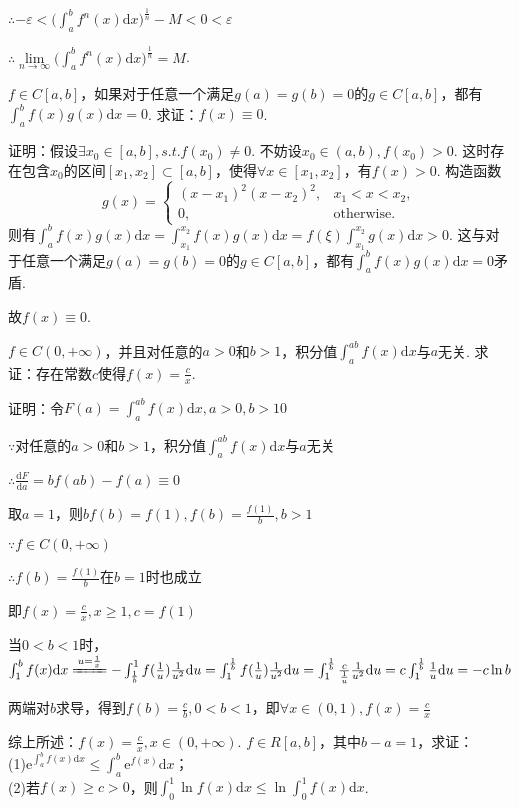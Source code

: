 \documentclass[12pt,UTF8]{ctexart}
\begin{document}
\begin{enumerate}
$\therefore-\varepsilon<\Big(\int_a^bf^n(x)\mathrm dx\Big)^{\frac1n}-M<0<\varepsilon$

$\therefore\lim\limits_{n\rightarrow\infty}\Big(\int_a^bf^n(x)\mathrm dx\Big)^{\frac1n}=M$.

$f\in C[a,b]$，如果对于任意一个满足$g(a)=g(b)=0$的$g\in C[a,b]$，都有$\int_a^bf(x)g(x)\mathrm dx=0$. 求证：$f(x)\equiv0$.

证明：假设$\exists x_0\in[a,b],s.t.f(x_0)\neq0$. 不妨设$x_0\in(a,b),f(x_0)>0$. 这时存在包含$x_0$的区间$[x_1,x_2]\subset[a,b]$，使得$\forall x\in[x_1,x_2]$，有$f(x)>0$. 构造函数
\[
g(x)=\begin{cases}
(x-x_1)^2(x-x_2)^2,&x_1<x<x_2,\\
0,&\text{otherwise}.
\end{cases}
\]
则有$\int_a^bf(x)g(x)\mathrm dx=\int_{x_1}^{x_2}f(x)g(x)\mathrm dx=f(\xi)\int_{x_1}^{x_2}g(x)\mathrm dx>0$. 这与对于任意一个满足$g(a)=g(b)=0$的$g\in C[a,b]$，都有$\int_a^bf(x)g(x)\mathrm dx=0$矛盾.

故$f(x)\equiv0$.

$f\in C(0,+\infty)$，并且对任意的$a>0$和$b>1$，积分值$\int_a^{ab}f(x)\mathrm dx$与$a$无关. 求证：存在常数$c$使得$f(x)=\frac cx$.

证明：令$F(a)=\int_a^{ab}f(x)\mathrm dx,a>0,b>10$

$\because$对任意的$a>0$和$b>1$，积分值$\int_a^{ab}f(x)\mathrm dx$与$a$无关

$\therefore\frac{\mathrm dF}{\mathrm da}=bf(ab)-f(a)\equiv0$

取$a=1$，则$bf(b)=f(1),f(b)=\frac{f(1)}b,b>1$

$\because f\in C(0,+\infty)$

$\therefore f(b)=\frac{f(1)}b$在$b=1$时也成立

即$f(x)=\frac cx,x\geq1,c=f(1)$

当$0<b<1$时，$\int_1^bf(x)\mathrm dx\xlongequal{u=\frac1x}-\int_{\frac1b}^1f(\frac1u)\frac1{u^2}\mathrm du=\int_1^{\frac1b}f(\frac1u)\frac1{u^2}\mathrm du=\int_1^{\frac1b}\frac c{\frac1u}\frac1{u^2}\mathrm du\\
=c\int_1^{\frac1b}\frac1u\mathrm du=-c\ln b$

两端对$b$求导，得到$f(b)=\frac cb,0<b<1$，即$\forall x\in(0,1),f(x)=\frac cx$

综上所述：$f(x)=\frac cx,x\in(0,+\infty)$.
$f\in R[a,b]$，其中$b-a=1$，求证：
\\
(1)$\mathrm e^{\int_a^bf(x)\mathrm dx}\leq\int_a^b\mathrm e^{f(x)}\mathrm dx$；\\
(2)若$f(x)\geq c>0$，则$\int_0^1\ln f(x)\mathrm dx\leq\ln\int_0^1f(x)\mathrm dx$.


\end{enumerate}
\end{document}
